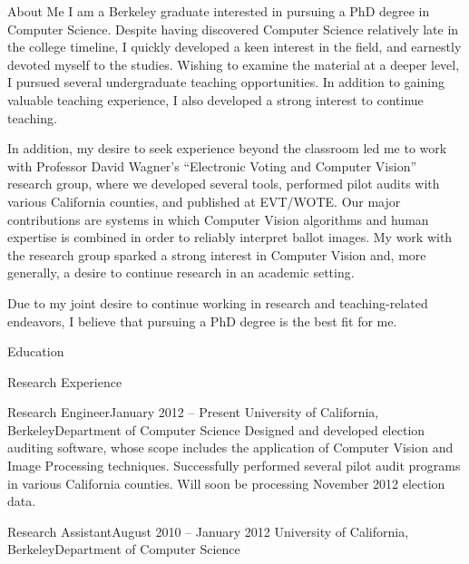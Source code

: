 \documentclass{resume}
\begin{document}
\maketitle
\thispagestyle{empty} %

\begin{component}{About Me}
I am a Berkeley graduate interested in pursuing a PhD degree in Computer 
Science. Despite having discovered Computer Science relatively late in 
the college timeline, I quickly developed a keen interest in the field, 
and earnestly devoted myself to the studies. Wishing to examine the 
material at a deeper level, I pursued several undergraduate 
teaching opportunities. In addition to gaining valuable teaching 
experience, I also developed a strong interest to continue teaching. 

In addition, my desire to seek experience beyond the classroom led me to
work with Professor David Wagner's ``Electronic Voting and Computer Vision''
research group, where we developed several tools, performed pilot audits
with various California counties, and published at EVT/WOTE. Our major
contributions are systems in which Computer Vision algorithms and human
expertise is combined in order to reliably interpret ballot images. 
My work with
the research group sparked a strong interest in Computer 
Vision and, more generally, a desire to continue research in an
academic setting.

Due to my joint desire to continue working in research and teaching-related
endeavors, I believe that pursuing a PhD degree is the best fit for me.
\end{component}

\vspace{-0.5em}

\begin{component}{Education}
\end{component}

\begin{component}{Research Experience}
    \begin{position}{Research Engineer}{January 2012 -- Present}
        {University of California, Berkeley}{Department of Computer Science}
    {Designed and developed election auditing software, whose scope includes the application of Computer Vision and Image Processing techniques. Successfully performed several pilot audit programs in various California counties. Will soon be processing November 2012 election data.}
    \end{position}
    
    \begin{position}{Research Assistant}{August 2010 -- January 2012}
        {University of California, Berkeley}{Department of Computer Science}
    {}
    \end{position}
\end{component}
\end{document}
